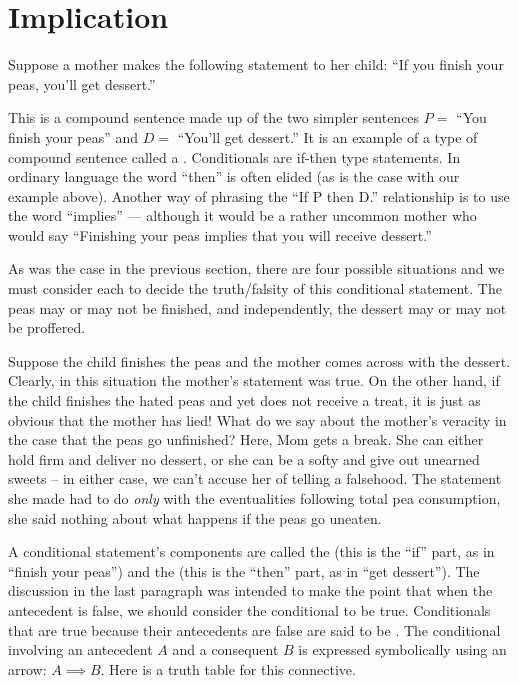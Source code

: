 \newpage




\newpage

\section{Implication}
\label{sec:impl}

Suppose a mother makes the following statement to her child:
``If you finish your peas, you'll get dessert.''

This is a compound sentence made up of the two simpler
sentences $P=$ ``You finish your peas'' and $D=$ ``You'll get dessert.''
It is an example of a type of compound sentence called a 
.  Conditionals are if-then type statements.  
In ordinary language the word ``then'' is often elided (as is the case
with our example above).  Another way of phrasing the ``If P then D.'' 
relationship is to use the word ``implies'' --- although it would be
a rather uncommon mother who would say ``Finishing your peas implies
that you will receive dessert.'' 

As was the case in the previous section, there are four possible
situations and we must consider each to decide the truth/falsity 
of this conditional statement.  The peas may or may not be finished,
and independently, the dessert may or may not be proffered.   

Suppose the child finishes the peas and the mother comes across
with the dessert.  Clearly, in this situation the mother's statement 
was true.  On the other hand, if the child finishes the hated peas
and yet does not receive a treat, it is just as obvious that the 
mother has lied! 
What do we say about the mother's veracity in the case that the peas
go unfinished?  Here, Mom gets a break.  She can either hold firm
and deliver no dessert, or she can be a softy and give out unearned 
sweets -- in either case, we can't accuse her of telling a falsehood.
The statement she made had to do {\em only} with the eventualities
following total pea consumption, she said nothing about what happens
if the peas go uneaten.

A conditional statement's components are called the 
(this is the ``if'' part, as in ``finish
your peas'') and the  (this is the ``then'' part, as in
``get dessert'').  The discussion in the 
last paragraph was intended to make the point that when the antecedent
is false, we should consider the conditional to be true.  Conditionals
that are true because their antecedents are false are said to
be .  The conditional 
involving an antecedent $A$
and a consequent $B$ is expressed symbolically using an arrow: 
$A \implies B$.  Here is a truth table for this connective.

